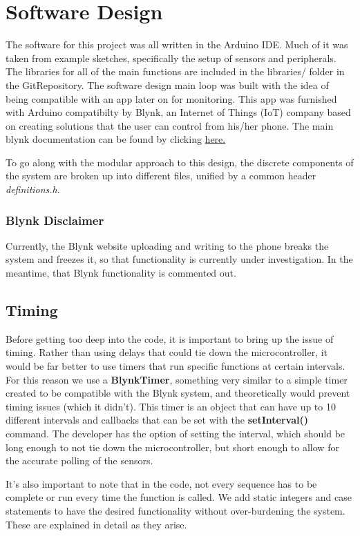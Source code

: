 \documentclass{article}
\begin{document}
\section{Software Design}
The software for this project was all written in the Arduino IDE. Much of it was taken from example sketches, specifically the setup of sensors and peripherals. The libraries for all of the main functions are included in the libraries/ folder in the GitRepository. The software design main loop was built with the idea of being compatible with an app later on for monitoring. This app was furnished with Arduino compatibilty by Blynk, an Internet of Things (IoT) company based on creating solutions that the user can control from his/her phone. The main blynk documentation can be found by clicking \href{https://docs.blynk.cc/}{here.}

To go along with the modular approach to this design, the discrete components of the system are broken up into different files, unified by a common header \textit{definitions.h}.

\subsubsection{Blynk Disclaimer}
 Currently, the Blynk website uploading and writing to the phone breaks the system and freezes it, so that functionality is currently under investigation. In the meantime, that Blynk functionality is commented out. 

\subsection{Timing}
Before getting too deep into the code, it is important to bring up the issue of timing. Rather than using delays that could tie down the microcontroller, it would be far better to use timers that run specific functions at certain intervals. For this reason we use a \textbf{BlynkTimer}, something very similar to a simple timer created to be compatible with the Blynk system, and theoretically would prevent timing issues (which it didn't). This timer is an object that can have up to 10 different intervals and callbacks that can be set with the \textbf{setInterval()} command. The developer has the option of setting the interval, which should be long enough to not tie down the microcontroller, but short enough to allow for the accurate polling of the sensors. 

It's also important to note that in the code, not every sequence has to be complete or run every time the function is called. We add static integers and case statements to have the desired functionality without over-burdening the system. These are explained in detail as they arise. 
\end{document}
